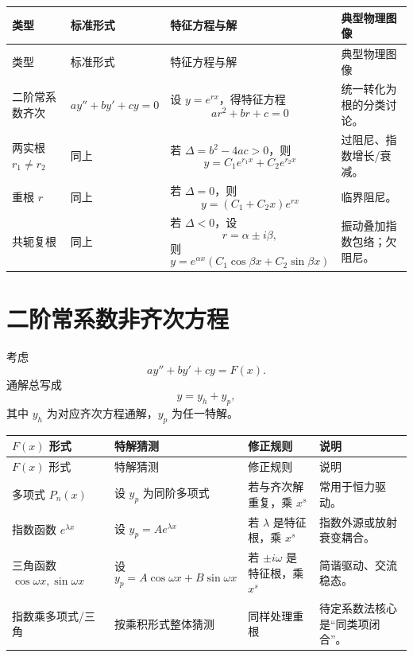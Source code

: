 \begin{longtable}{p{}p{}p{}p{}}
\toprule
类型 & 标准形式 & 特征方程与解 & 典型物理图像 \\
\midrule
\endfirsthead
\toprule
类型 & 标准形式 & 特征方程与解 & 典型物理图像 \\
\midrule
\endhead
\bottomrule
\endfoot
二阶常系数齐次 & $ay''+by'+cy=0$ & 设 $y=e^{rx}$，得特征方程
\[
 ar^2+br+c=0
\]
 & 统一转化为根的分类讨论。 \\

两实根 $r_1\neq r_2$ & 同上 & 若 $\Delta=b^2-4ac>0$，则
\[
 y=C_1e^{r_1x}+C_2e^{r_2x}
\]
 & 过阻尼、指数增长/衰减。 \\

重根 $r$ & 同上 & 若 $\Delta=0$，则
\[
 y=(C_1+C_2x)e^{rx}
\]
 & 临界阻尼。 \\

共轭复根 & 同上 & 若 $\Delta<0$，设
\[
 r=\alpha\pm i\beta,
\]
则
\[
 y=e^{\alpha x}(C_1\cos \beta x+C_2\sin \beta x)
\]
 & 振动叠加指数包络；欠阻尼。 \\
\end{longtable}

\section{二阶常系数非齐次方程}

考虑
\[
 ay''+by'+cy=F(x).
\]
通解总写成
\[
 y=y_h+y_p,
\]
其中 $y_h$ 为对应齐次方程通解，$y_p$ 为任一特解。

\begin{longtable}{p{}p{}p{}p{}}
\toprule
$F(x)$ 形式 & 特解猜测 & 修正规则 & 说明 \\
\midrule
\endfirsthead
\toprule
$F(x)$ 形式 & 特解猜测 & 修正规则 & 说明 \\
\midrule
\endhead
\bottomrule
\endfoot
多项式 $P_n(x)$ & 设 $y_p$ 为同阶多项式 & 若与齐次解重复，乘 $x^s$ & 常用于恒力驱动。 \\

指数函数 $e^{\lambda x}$ & 设 $y_p=Ae^{\lambda x}$ & 若 $\lambda$ 是特征根，乘 $x^s$ & 指数外源或放射衰变耦合。 \\

三角函数 $\cos \omega x,\sin \omega x$ & 设
\[
y_p=A\cos \omega x+B\sin \omega x
\]
 & 若 $\pm i\omega$ 是特征根，乘 $x^s$ & 简谐驱动、交流稳态。 \\

指数乘多项式/三角 & 按乘积形式整体猜测 & 同样处理重根 & 待定系数法核心是“同类项闭合”。 \\
\end{longtable}

